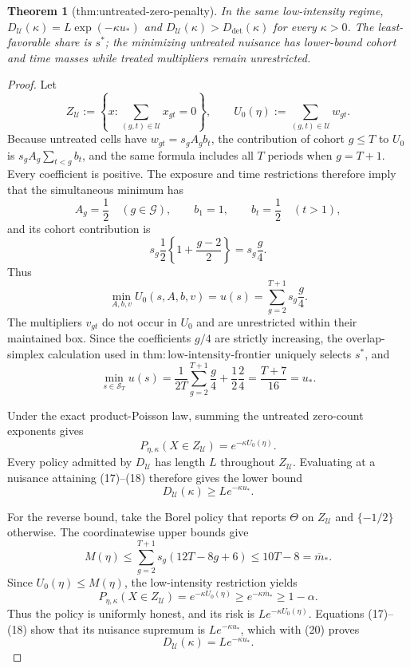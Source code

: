 \documentclass{article}
\newtheorem{theorem}{Theorem}
\begin{document}
\begin{theorem}[thm:untreated-zero-penalty]\label{thm:untreated-zero-penalty}
In the same low-intensity regime, \(D_{\mathcal U}(\kappa)=L\exp(-\kappa u_*)\) and \(D_{\mathcal U}(\kappa)>D_{\mathrm{det}}(\kappa)\) for every \(\kappa>0\). The least-favorable share is \(s^*\); the minimizing untreated nuisance has lower-bound cohort and time masses while treated multipliers remain unrestricted.
\end{theorem}
\begin{proof}
Let
\[
 Z_{\mathcal U}:=\left\{x:\sum_{(g,t)\in\mathcal U}x_{gt}=0\right\},
 \qquad
 U_0(\eta):=\sum_{(g,t)\in\mathcal U}w_{gt}.
\]
Because untreated cells have \(w_{gt}=s_gA_gb_t\), the contribution of cohort \(g\le T\) to \(U_0\) is \(s_gA_g\sum_{t<g}b_t\), and the same formula includes all \(T\) periods when \(g=T+1\).  Every coefficient is positive.  The exposure and time restrictions therefore imply that the simultaneous minimum has
\[
 A_g=\frac12\quad(g\in\mathcal G),
 \qquad b_1=1,
 \qquad b_t=\frac12\quad(t>1),
\]
and its cohort contribution is
\[
 s_g\frac12\left\{1+\frac{g-2}{2}\right\}
 =s_g\frac g4.
\]
Thus
\[
 \min_{A,b,v}U_0(s,A,b,v)
 =u(s)=\sum_{g=2}^{T+1}s_g\frac g4.
\tag{17}
\]
The multipliers \(v_{gt}\) do not occur in \(U_0\) and are unrestricted within their maintained box.  Since the coefficients \(g/4\) are strictly increasing, the overlap-simplex calculation used in \(\mathrm{thm{:}low\text{-}intensity\text{-}frontier}\) uniquely selects \(s^*\), and
\[
 \min_{s\in\mathcal S_T}u(s)
 =\frac{1}{2T}\sum_{g=2}^{T+1}\frac g4
  +\frac12\frac24
 =\frac{T+7}{16}=u_*.
\tag{18}
\]

Under the exact product-Poisson law, summing the untreated zero-count exponents gives
\[
 P_{\eta,\kappa}(X\in Z_{\mathcal U})
 =e^{-\kappa U_0(\eta)}.
\tag{19}
\]
Every policy admitted by \(D_{\mathcal U}\) has length \(L\) throughout \(Z_{\mathcal U}\).  Evaluating at a nuisance attaining (17)--(18) therefore gives the lower bound
\[
 D_{\mathcal U}(\kappa)\ge Le^{-\kappa u_*}.
\tag{20}
\]

For the reverse bound, take the Borel policy that reports \(\Theta\) on \(Z_{\mathcal U}\) and \(\{-1/2\}\) otherwise.  The coordinatewise upper bounds give
\[
 M(\eta)\le\sum_{g=2}^{T+1}s_g(12T-8g+6)
 \le10T-8=\overline m_*.
\]
Since \(U_0(\eta)\le M(\eta)\), the low-intensity restriction yields
\[
 P_{\eta,\kappa}(X\in Z_{\mathcal U})
 =e^{-\kappa U_0(\eta)}
 \ge e^{-\kappa\overline m_*}
 \ge1-\alpha.
\]
Thus the policy is uniformly honest, and its risk is \(Le^{-\kappa U_0(\eta)}\).  Equations (17)--(18) show that its nuisance supremum is \(Le^{-\kappa u_*}\), which with (20) proves
\[
 D_{\mathcal U}(\kappa)=Le^{-\kappa u_*}.
\tag{21}
\]


\end{proof}
\end{document}
